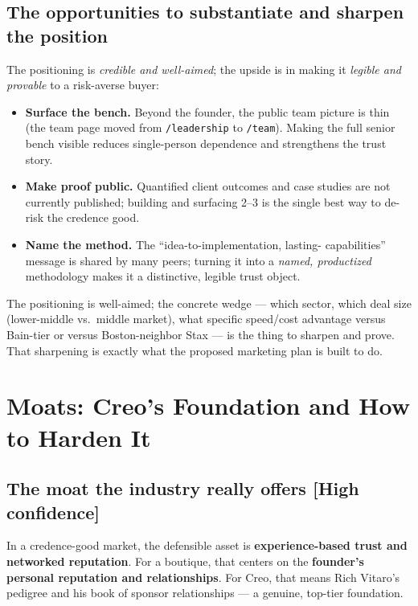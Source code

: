 \documentclass[11pt]{article}
\newcommand{\high}{\textcolor{green!45!black}{\textbf{[High confidence]}}}
\begin{document}
\subsection{The opportunities to substantiate and sharpen the position}
The positioning is \emph{credible and well-aimed}; the upside is in making it
\emph{legible and provable} to a risk-averse buyer:
\begin{itemize}
  \item \textbf{Surface the bench.} Beyond the founder, the public team picture is
  thin (the team page moved from \texttt{/leadership} to \texttt{/team}). Making
  the full senior bench visible reduces single-person dependence and strengthens
  the trust story.
  \item \textbf{Make proof public.} Quantified client outcomes and case studies
  are not currently published; building and surfacing 2--3 is the single best way
  to de-risk the credence good.
  \item \textbf{Name the method.} The ``idea-to-implementation, lasting-
  capabilities'' message is shared by many peers; turning it into a \emph{named,
  productized} methodology makes it a distinctive, legible trust object.
\end{itemize}

\begin{takeaway}
The positioning is well-aimed; the concrete wedge --- which sector, which deal
size (lower-middle vs.\ middle market), what specific speed/cost advantage versus
Bain-tier or versus Boston-neighbor Stax --- is the thing to sharpen and prove.
That sharpening is exactly what the proposed marketing plan is built to do.
\end{takeaway}

\section{Moats: Creo's Foundation and How to Harden It}

\subsection{The moat the industry really offers \high}
In a credence-good market, the defensible asset is \textbf{experience-based
trust and networked reputation}. For a boutique, that centers on the
\textbf{founder's personal reputation and relationships}. For Creo, that means
Rich Vitaro's pedigree and his book of sponsor relationships --- a genuine,
top-tier foundation.
\end{document}

